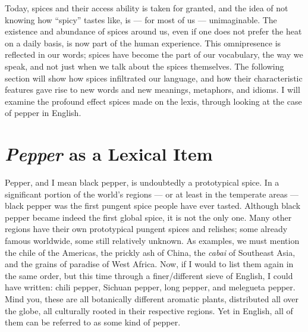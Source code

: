 
Today, spices and their access ability is taken for granted, and the idea of not knowing how ``spicy'' tastes like, is --- for most of us --- unimaginable. The existence and abundance of spices around us, even if one does not prefer the heat on a daily basis, is now part of the human experience. This omnipresence is reflected in our words; spices have become the part of our vocabulary, the way we speak, and not just when we talk about the spices themselves. The following section will show how spices infiltrated our language, and how their characteristic features gave rise to new words and new meanings, metaphors, and idioms. I will examine the profound effect spices made on the lexis, through looking at the case of pepper in English.

\section{\textit{Pepper} as a Lexical Item}

Pepper, and I mean black pepper, is undoubtedly a prototypical spice. In a significant portion of the world's regions --- or at least in the temperate areas --- black pepper was the first pungent spice people have ever tasted. Although black pepper became indeed the first global spice, it is not the only one. Many other regions have their own prototypical pungent spices and relishes; some already famous worldwide, some still relatively unknown. As examples, we must mention the chile of the Americas, the prickly ash of China, the \textit{cabai} of Southeast Asia, and the grains of paradise of West Africa. Now, if I would to list them again in the same order, but this time through a finer/different sieve of English, I could have written: chili pepper, Sichuan pepper, long pepper, and melegueta pepper. Mind you, these are all botanically different aromatic plants, distributed all over the globe, all culturally rooted in their respective regions. Yet in English, all of them can be referred to as some kind of pepper. 

